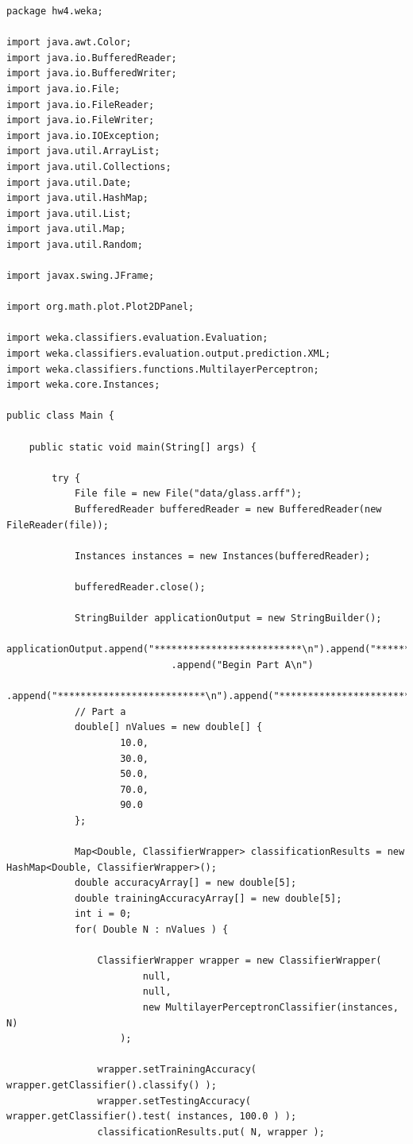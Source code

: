 \begin{lstlisting}
package hw4.weka;

import java.awt.Color;
import java.io.BufferedReader;
import java.io.BufferedWriter;
import java.io.File;
import java.io.FileReader;
import java.io.FileWriter;
import java.io.IOException;
import java.util.ArrayList;
import java.util.Collections;
import java.util.Date;
import java.util.HashMap;
import java.util.List;
import java.util.Map;
import java.util.Random;

import javax.swing.JFrame;

import org.math.plot.Plot2DPanel;

import weka.classifiers.evaluation.Evaluation;
import weka.classifiers.evaluation.output.prediction.XML;
import weka.classifiers.functions.MultilayerPerceptron;
import weka.core.Instances;

public class Main {

	public static void main(String[] args) {

		try {
			File file = new File("data/glass.arff");
			BufferedReader bufferedReader = new BufferedReader(new FileReader(file));
			
			Instances instances = new Instances(bufferedReader);
			
			bufferedReader.close();
			
			StringBuilder applicationOutput = new StringBuilder();
			applicationOutput.append("**************************\n").append("**************************\n").append("**************************\n")
							 .append("Begin Part A\n")
							 .append("**************************\n").append("**************************\n").append("**************************\n");
			// Part a
			double[] nValues = new double[] { 
					10.0,
					30.0,
					50.0,
					70.0,
					90.0
			};
			
			Map<Double, ClassifierWrapper> classificationResults = new HashMap<Double, ClassifierWrapper>();
			double accuracyArray[] = new double[5];
			double trainingAccuracyArray[] = new double[5];
			int i = 0;
			for( Double N : nValues ) {
				
				ClassifierWrapper wrapper = new ClassifierWrapper(
						null,
						null,
						new MultilayerPerceptronClassifier(instances, N)
					);
				
				wrapper.setTrainingAccuracy( wrapper.getClassifier().classify() );
				wrapper.setTestingAccuracy( wrapper.getClassifier().test( instances, 100.0 ) );
				classificationResults.put( N, wrapper );


\end{lstlisting}
